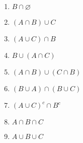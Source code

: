 \begin{enumerate}
\item $B \cap \varnothing$ \answer{$\varnothing$}

\item $(A \cap B) \cup C$ 

\item $(A \cup C) \cap B$ 

\item $B \cup (A \cap C)$ 

\item $(A \cap B) \cup (C \cap B)$ 

\item $(B \cup A) \cap (B \cup C)$ 

\item $(A \cup C)^c \cap B^c$ 

\item $A \cap B \cap C$ 

\item $A \cup B \cup C$ 
\end{enumerate}
\pagebreak


